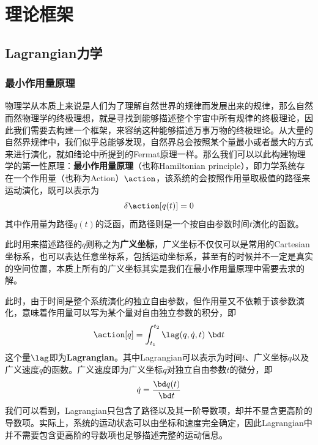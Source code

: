 
\part{理论框架}
\chapter{Lagrangian力学}
\section{最小作用量原理}
\label{sec:princ_least_action}
物理学从本质上来说是人们为了理解自然世界的规律而发展出来的规律，那么自然而然物理学的终极理想，就是寻找到能够描述整个宇宙中所有规律的终极理论，因此我们需要去构建一个框架，来容纳这种能够描述万事万物的终极理论。从大量的自然界规律中，我们似乎总能够发现，自然界总会按照某个量最小或者最大的方式来进行演化，就如绪论中所提到的Fermat原理一样。那么我们可以以此构建物理学的第一性原理：\textbf{最小作用量原理}（也称Hamiltonian principle），即力学系统存在一个作用量（也称为Action）$\action$，该系统的会按照作用量取极值的路径来运动演化，既可以表示为
\begin{equation}
    \delta\action[q(t)] = 0\label{eq:1stprinciple}
\end{equation}
其中作用量为路径$q(t)$的泛函，而路径则是一个按自由参数时间$t$演化的函数。

此时用来描述路径的$q$则称之为\textbf{广义坐标}，广义坐标不仅仅可以是常用的Cartesian坐标系，也可以表达任意坐标系，包括运动坐标系，甚至有的时候并不一定是真实的空间位置，本质上所有的广义坐标其实是我们在最小作用量原理中需要去求的解。



此时，由于时间是整个系统演化的独立自由参数，但作用量又不依赖于该参数演化，意味着作用量可以写为某个量对自由独立参数的积分，即
\begin{equation}
     \action [q]=  \int_{t_1} ^{t_2} \lag(q,\dot{q},t) ~\bd t 
\end{equation}
这个量$\lag$即为\textbf{Lagrangian}。其中Lagrangian可以表示为时间$t$、广义坐标$q$以及广义速度$\dot{q}$的函数。广义速度即为广义坐标$q$对独立自由参数$t$的微分，即
\begin{equation}
    \dot{q} = \frac{\bd q(t)}{\bd t}
\end{equation}
我们可以看到，Lagrangian只包含了路径以及其一阶导数项，却并不显含更高阶的导数项。实际上，系统的运动状态可以由坐标和速度完全确定，因此Lagrangian中并不需要包含更高阶的导数项也足够描述完整的运动信息。

